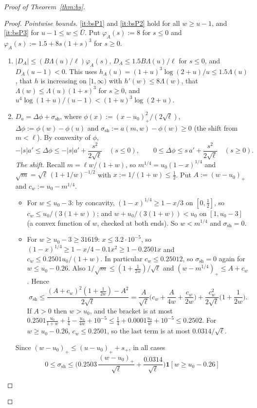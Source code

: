 \begin{proof}[Proof of Theorem~\ref{thm:bs}]
\begin{proof}
\emph{Pointwise bounds.} \ref{it:bsP1} and \ref{it:bsP2} hold for all $w\ge u-1$, and \ref{it:bsP3} for $u-1\le w\le\bar U$. Put $\varphi_A(s):=8$ for $s\le0$ and $\varphi_A(s):=1.5+8s(1+s)^3$ for $s\ge0$.
\begin{enumerate}[label=(P\arabic*)]
\item\label{it:bsP1} $|D_A|\le(B\Lambda(u)/\ell)\varphi_A(s)$, $D_A\le1.5B\Lambda(u)/\ell$ for $s\le0$, and $D_A(u-1)<0$. This uses
  $h_A(u)=(1+u)^3\log(2+u)/u\le1.5\Lambda(u)$, that $h$ is increasing on $[1,\infty)$ with $h'(w)\le8\Lambda(w)$, that
  $\Lambda(w)\le\Lambda(u)(1+s)^3$ for $s\ge0$, and $u^4\log(1+u)/(u-1)<(1+u)^3\log(2+u)$.
\item\label{it:bsP2} $D_a=\Delta\phi+\sigma_{\mathrm{sh}}$, where $\phi(x):=(x-u_0)_+^2/(2\sqrt\ell)$, $\Delta\phi:=\phi(w)-\phi(u)$ and
  $\sigma_{\mathrm{sh}}:=a(m,w)-\phi(w)\ge0$ (the shift from $m<\ell$). By convexity of $\phi$,
  \[
    -|s|a'\le\Delta\phi\le-|s|a'+\frac{s^2}{2\sqrt\ell}\quad(s\le0),\qquad0\le\Delta\phi\le s\,a'+\frac{s^2}{2\sqrt\ell}\quad(s\ge0).
  \]
  \emph{The shift.} Recall $m=\ell w/(1+w)$, so $m^{1/4}=u_0(1-x)^{1/4}$ and $\sqrt m=\sqrt\ell\,(1+1/w)^{-1/2}$ with
  $x:=1/(1+w)\le\frac12$. Put $A:=(w-u_0)_+$ and $c_w:=u_0-m^{1/4}$.
  \begin{itemize}
  \item For $w\le u_0-3$: by concavity, $(1-x)^{1/4}\ge1-x/3$ on $[0,\frac12]$, so $c_w\le u_0/(3(1+w))$; and
    $w+u_0/(3(1+w))<u_0$ on $[1,u_0-3]$ (a convex function of $w$, checked at both ends). So $w<m^{1/4}$ and
    $\sigma_{\mathrm{sh}}=0$.
  \item For $w\ge u_0-3\ge31619$: $x\le3.2\cdot10^{-5}$, so $(1-x)^{1/4}\ge1-x/4-0.1x^2\ge1-0.2501x$ and
    $c_w\le0.2501u_0/(1+w)$. In particular $c_w\le0.25012$, so $\sigma_{\mathrm{sh}}=0$ again for $w\le u_0-0.26$. Also
    $1/\sqrt m\le(1+\frac1{2w})/\sqrt\ell$ and $(w-m^{1/4})_+\le A+c_w$. Hence
    \[
      \sigma_{\mathrm{sh}}\le\frac{(A+c_w)^2(1+\frac1{2w})-A^2}{2\sqrt\ell}
      =\frac{A}{\sqrt\ell}\Big(c_w+\frac{A}{4w}+\frac{c_w}{2w}\Big)+\frac{c_w^2}{2\sqrt\ell}\Big(1+\frac1{2w}\Big).
    \]
    If $A>0$ then $w>u_0$, and the bracket is at most
    $0.2501\frac{u_0}{1+w}+\frac14-\frac{u_0}{4w}+10^{-5}\le\frac14+0.0001\frac{u_0}w+10^{-5}\le0.2502$. For $w\ge u_0-0.26$,
    $c_w\le0.2501$, so the last term is at most $0.0314/\sqrt\ell$.
  \end{itemize}
  Since $(w-u_0)_+\le(u-u_0)_++s_+$, in all cases
  \[
    0\le\sigma_{\mathrm{sh}}\le\Big(0.2503\,\frac{(w-u_0)_+}{\sqrt\ell}+\frac{0.0314}{\sqrt\ell}\Big)\mathbf 1[w\ge u_0-0.26]
\]
\end{enumerate}
\end{proof}
\end{proof}
